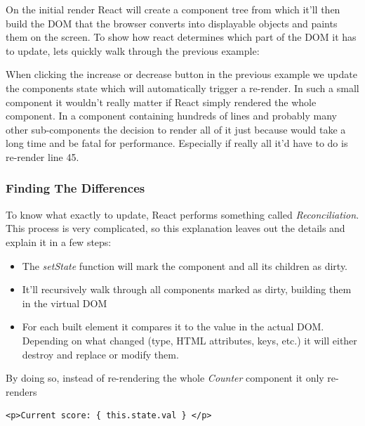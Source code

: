 On the initial render React will create a component tree from which it'll then build the DOM that the browser converts into displayable objects and paints them on the screen. To show how react determines which part of the DOM it has to update, lets quickly walk through the previous example:

When clicking the increase or decrease button in the previous example we update the components state which will automatically trigger a re-render. In such a small component it wouldn't really matter if React simply rendered the whole component. In a component containing hundreds of lines and probably many other sub-components the decision to render all of it just because would take a long time and be fatal for performance. Especially if really all it'd have to do is re-render line 45.

\subsubsection{Finding The Differences}
To know what exactly to update, React performs something called \emph{Reconciliation}. This process is very complicated, so this explanation leaves out the details and explain it in a few steps: 
\begin{itemize}
\item The \emph{setState} function will mark the component and all its children as dirty. \cite{GethylGeorgeKurian}
\item It'll recursively walk through all components marked as dirty, building them in the virtual DOM \cite{GethylGeorgeKurian}
\item For each built element it compares it to the value in the actual DOM. Depending on what changed (type, HTML attributes, keys, etc.) it will either destroy and replace or modify them.  \cite{ReactDocs} 
\end{itemize}
By doing so, instead of re-rendering the whole \emph{Counter} component it only re-renders
\begin{lstlisting}[caption={Updated line}]
<p>Current score: { this.state.val } </p>
\end{lstlisting}

